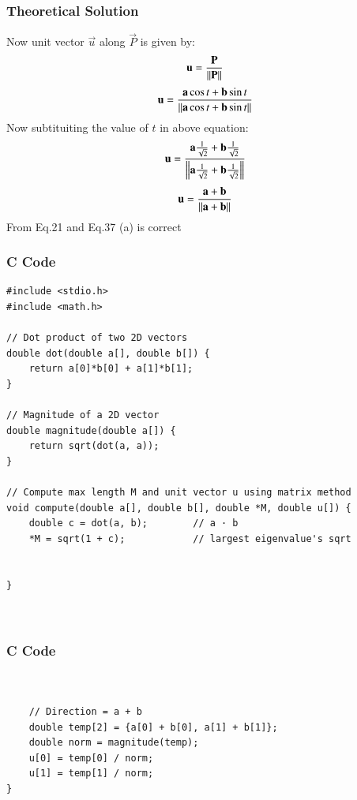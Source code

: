 \documentclass{beamer}
\begin{document}
\begin{frame}
\frametitle{Theoretical Solution}
    Now unit vector $\Vec{u}$ along $\Vec{P}$ is given by:
\begin{align}
    \Vec{{\Vec{u}}}=\frac{\Vec{P}}{\norm{\Vec{P}}}
\end{align}
\begin{align}
\Vec{\Vec{u}}=\frac{\vec{a}\cos{t} + \vec{b}\sin{t}}{\norm{\vec{a}\cos{t} + \vec{b}\sin{t}}}
\end{align}
Now subtituiting the value of $t$ in above equation:
\begin{align}
    \Vec{u}=\frac{\Vec{a}\frac{1}{\sqrt{2}} + \Vec{b}\frac{1}{\sqrt{2}}}{\norm{\Vec{a}\frac{1}{\sqrt{2}} + \Vec{b}\frac{1}{\sqrt{2}}}}
\end{align}
\begin{align}
    \Vec{u}=\frac{\Vec{a} + \Vec{b}}{\norm{\Vec{a} + \Vec{b}}}
\end{align}
From Eq.21 and Eq.37 (a) is correct

    
\end{frame}




\begin{frame}[fragile]
    \frametitle{C Code  }

    \begin{lstlisting}
#include <stdio.h>
#include <math.h>

// Dot product of two 2D vectors
double dot(double a[], double b[]) {
    return a[0]*b[0] + a[1]*b[1];
}

// Magnitude of a 2D vector
double magnitude(double a[]) {
    return sqrt(dot(a, a));
}

// Compute max length M and unit vector u using matrix method
void compute(double a[], double b[], double *M, double u[]) {
    double c = dot(a, b);        // a · b
    *M = sqrt(1 + c);            // largest eigenvalue's sqrt

   
}



    \end{lstlisting}
\end{frame}

\begin{frame}[fragile]
    \frametitle{C Code  }

    \begin{lstlisting}


    // Direction = a + b
    double temp[2] = {a[0] + b[0], a[1] + b[1]};
    double norm = magnitude(temp);
    u[0] = temp[0] / norm;
    u[1] = temp[1] / norm;
}



    \end{lstlisting}
\end{frame}
\end{document}
